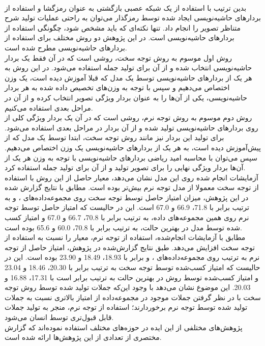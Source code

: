 \\
بدین ترتیب با استفاده از یک شبکه عصبی بازگشتی به عنوان رمزگشا و استفاده از بردارهای حاشیه‌نویسی ایجاد شده توسط رمزگذار می‌توان به راحتی عملیات تولید شرح متناظر تصویر را انجام داد. تنها نکته‌ای که باید مشخص شود، چگونگی استفاده از بردارهای حاشیه‌نویسی است. در این پژوهش دو روش مختلف برای استفاده از بردارهای حاشیه‌نویسی مطرح شده است.
\\
روش اول موسوم به روش توجه سخت، روشی است که در آن فقط یک بردار حاشیه‌نویسی انتخاب شده و از آن برای تولید جمله استفاده می‌شود. در این روش به هر یک از بردارهای حاشیه‌نویسی توسط یک مدل که قبلا آموزش دیده است، یک وزن اختصاص می‌دهیم و سپس با توجه به وزن‌های تخصیص داده شده به هر بردار حاشیه‌نویسی، یکی از آن‌ها را به عنوان بردار ویژگی تصویر انتخاب کرده و از آن در مراحل بعدی استفاده می‌کنیم.
\\
روش دوم موسوم به روش توجه نرم، روشی است که در آن یک بردار ویژگی کلی از روی بردارهای حاشیه‌نویسی تولید شده و از آن بردار در مراحل بعدی استفاده می‌شود. برای تولید این بردار نیز مانند روش توجه سخت، ابتدا توسط یک مدل که از پیش‌آموزش دیده است، به هر یک از بردارهای حاشیه‌نویسی یک وزن اختصاص می‌دهیم. سپس می‌توان با محاسبه امید ریاضی بردارهای حاشیه‌نویسی با توجه به وزن هر یک از آن‌ها بردار ویژگی نهایی را برای تصویر تولید و از آن برای تولید جمله استفاده کرد.
\\
آزمایشات انجام شده روی این مدل نشان می‌دهد، معیار  حاصل از این روش با استفاده از توجه سخت معمولا از مدل توجه نرم بیش‌تر بوده است. مطابق با نتایج گزارش شده در این پژوهش، میزان امتیاز  حاصل توسط توجه سخت روی مجموعه‌داده‌های ،   و  به ترتیب برابر با 71.8، 66.9 و 67.0 است. این در حالیست که امتیاز حاصل توسط توجه نرم روی همین مجموعه‌های داده، به ترتیب برابر با 70.8، 66.7 و 67.0 و امتیاز کسب شده توسط مدل  در بهترین حالت، به ترتیب برابر با 70.8، 60.0 و 65.6 بوده است. 
\\
مطابق با آزمایشات انجام‌شده، استفاده از توجه نرم، معیار  را نسبت به استفاده از توجه سخت افزایش می‌دهد. طبق نتایج گزارش‌شده در پژوهش، امتیاز  حاصل از توجه نرم به ترتیب روی مجموعه‌داده‌های ،  و  برابر با 18.93، 18.49 و 23.90 بوده است. این در حالیست که امتیاز کسب‌شده توسط توجه سخت به ترتیب برابر با 20.30، 18.46 و 23.04 و امتیاز کسب‌شده توسط روش  در بهترین حالت به ترتیب برابر است با 17.31، 16.88 و 20.03. این موضوع نشان می‌دهد با وجود این‌که جملات تولید شده توسط روش توجه سخت با در نظر گرفتن جملات موجود در مجموعه‌داده از امتیاز بالاتری نسبت به جملات تولید شده توسط توجه نرم برخوردارند؛ استفاده از توجه نرم، منجر به تولید جملات قابل قبول‌تری توسط انسان می‌شود.
\\
پژوهش‌های مختلفی از این ایده در حوزه‌های مختلف استفاده نموده‌اند که گزارش مختصری از تعدادی از این پژوهش‌ها ارائه شده است.

